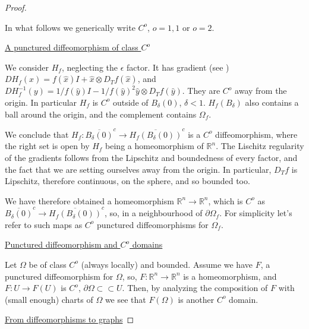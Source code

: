 \documentclass[english,a4paper,9pt,oneside]{scrbook}	%
\theoremstyle{break}
\newenvironment{mproof}[1][\proofname]{%
  \begin{proof}[#1]$ $\par\nobreak\ignorespaces
}{%
  \end{proof}
}
\renewcommand*{\proofname}{Proof}
\theoremstyle{remark}
\newcommand{\mR}{\mathbb{R}}
\newcommand{\cc}{\subset\subset}
\newcommand{\xh}{\hat{x}}
\newcommand{\yh}{\hat{y}}
\newcommand{\eps}{\epsilon}
\begin{document}
\begin{mproof}

In what follows we generically write $ C^o$, $o=1,1 $ or $o=2$.


\underline{A punctured diffeomorphism of class $C^o$}

We consider $H_f$, neglecting the $\eps$ factor. It has gradient (see \cite{deckelnick}) $D H_f(x) = f(\xh)I+\xh \otimes D_Tf(\xh)$, and  $D H_f^{-1}(y) =1/f(\yh)I-1/f(\yh)^2 \yh \otimes D_Tf(\yh)$. They are $C^o$ away from the origin. In particular $H_f$ is $C^o$  outside of $B_\delta(0)$, $\delta < 1$. $H_f(B_\delta)$ also contains a ball around the origin, and the complement contains $\Omega_f$.

We conclude that $H_f: \overline{B_\delta(0)}^c \rightarrow \overline{H_f(B_\delta(0))}^c$ is a $C^o$ diffeomorphism, where the right set is open by $H_f$ being a homeomorphism of $\mR^n$. The Lischitz regularity of the gradients follows from the Lipschitz and boundedness of every factor, and the fact that we are setting ourselves away from the origin. In particular, $D_T f$ is Lipschitz, therefore continuous, on the sphere, and so bounded too.

We have therefore obtained a homeomorphism $\mR^n \rightarrow \mR^n$, which is $C^o$ as $\overline{B_\delta(0)}^c \rightarrow \overline{H_f(B_\delta(0))}^c$, so, in a neighbourhood of $\partial \Omega_f$.
For simplicity let's refer to such maps as $C^o$ punctured diffeomorphisms for $\Omega_f$.

\underline{Punctured diffeomorphism and $C^o$ domains}

Let $\Omega$ be of class $C^o$ (always locally) and bounded. Assume we have $F$, a punctured diffeomorphism for $\Omega$, so, $F:\mR^n\rightarrow \mR^n$ is a homeomorphism, and $F: U\rightarrow F(U)$ is $C^o$, $\partial \Omega \cc U$. Then, by analyzing the composition of $F$ with (small enough) charts of $\Omega$ we see that $F(\Omega)$ is another $C^o$ domain. 

\underline{From diffeomorphisms to graphs}


\end{mproof}
\end{document}
